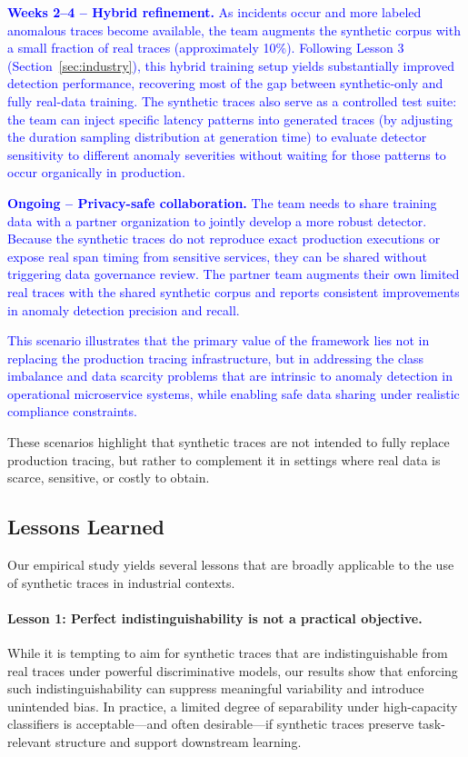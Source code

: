 \documentclass[sigconf,review]{acmart}
\begin{document}
\textcolor{blue}{\textbf{Weeks 2--4 -- Hybrid refinement.} As incidents occur and more labeled anomalous traces become available, the team augments the synthetic corpus with a small fraction of real traces (approximately 10\%). Following Lesson 3 (Section~\ref{sec:industry}), this hybrid training setup yields substantially improved detection performance, recovering most of the gap between synthetic-only and fully real-data training. The synthetic traces also serve as a controlled test suite: the team can inject specific latency patterns into generated traces (by adjusting the duration sampling distribution at generation time) to evaluate detector sensitivity to different anomaly severities without waiting for those patterns to occur organically in production.}

\textcolor{blue}{\textbf{Ongoing -- Privacy-safe collaboration.} The team needs to share training data with a partner organization to jointly develop a more robust detector. Because the synthetic traces do not reproduce exact production executions or expose real span timing from sensitive services, they can be shared without triggering data governance review. The partner team augments their own limited real traces with the shared synthetic corpus and reports consistent improvements in anomaly detection precision and recall.}

\textcolor{blue}{This scenario illustrates that the primary value of the framework lies not in replacing the production tracing infrastructure, but in addressing the class imbalance and data scarcity problems that are intrinsic to anomaly detection in operational microservice systems, while enabling safe data sharing under realistic compliance constraints.}

These scenarios highlight that synthetic traces are not intended to fully replace production tracing, but rather to complement it in settings where real data is scarce, sensitive, or costly to obtain.

\subsection{Lessons Learned}

Our empirical study yields several lessons that are broadly applicable to the use of synthetic traces in industrial contexts.

\paragraph{Lesson 1: Perfect indistinguishability is not a practical objective.}
While it is tempting to aim for synthetic traces that are indistinguishable from real traces under powerful discriminative models, our results show that enforcing such indistinguishability can suppress meaningful variability and introduce unintended bias. In practice, a limited degree of separability under high-capacity classifiers is acceptable---and often desirable---if synthetic traces preserve task-relevant structure and support downstream learning.
\end{document}

